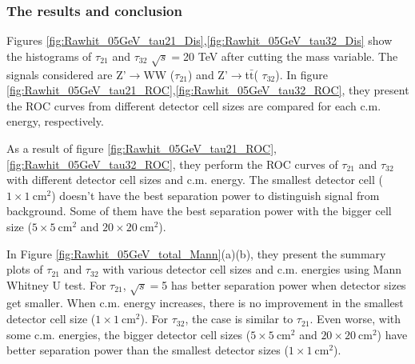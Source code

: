 \subsubsection{The results and conclusion}
Figures \ref{fig:Rawhit_05GeV_tau21_Dis},\ref{fig:Rawhit_05GeV_tau32_Dis} show the histograms of $\tau_{21}$ and $\tau_{32}$ $\sqrt{s}=$20 TeV after cutting the mass variable. The signals considered are Z'$\rightarrow$WW ($\tau_{21}$) and Z'$\rightarrow$t$\bar{\mathrm{t}}$( $\tau_{32}$). In figure \ref{fig:Rawhit_05GeV_tau21_ROC},\ref{fig:Rawhit_05GeV_tau32_ROC}, they present the ROC curves from different detector cell sizes are compared for each c.m. energy, respectively. 

As a result of figure \ref{fig:Rawhit_05GeV_tau21_ROC}, \ref{fig:Rawhit_05GeV_tau32_ROC}, they perform the ROC curves of $\tau_{21}$ and $\tau_{32}$ with different detector cell sizes and c.m. energy. The smallest detector cell ($1\times1~\mathrm{cm}^2$) doesn't have the best separation power to distinguish signal from background. Some of them have the best separation power with the bigger cell size ($5\times5~\mathrm{cm}^2$ and $20\times20~\mathrm{cm}^2$).

In Figure \ref{fig:Rawhit_05GeV_total_Mann}(a)(b), they present the summary plots of $\tau_{21}$ and $\tau_{32}$ with various detector cell sizes and c.m. energies using Mann Whitney U test. For $\tau_{21}$, $\sqrt{s}=$5 has better separation power when detector sizes get smaller. When c.m. energy increases, there is no improvement in the smallest detector cell size ($1\times1~\mathrm{cm}^2$). For $\tau_{32}$, the case is similar to  $\tau_{21}$. Even worse, with some c.m. energies, the bigger detector cell sizes ($5\times5~\mathrm{cm}^2$ and $20\times20~\mathrm{cm}^2$) have better separation power than the smallest detector sizes ($1\times1~\mathrm{cm}^2$). 

